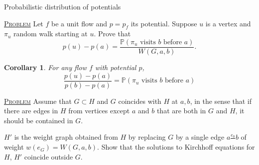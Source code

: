 \documentclass{report}
\newcommand{\matP}{\mathbb{P}}
\newcommand{\fancyem}[1]{\underline{\textsc{#1}}}
\newtheorem{corollary}{Corollary}[section]
\theoremstyle{definition}
\theoremstyle{remark}
\numberwithin{equation}{section}
\begin{document}

Probabilistic distribution of potentials

\fancyem{Problem} Let $f$ be a unit flow and $p = p_f$ its potential. Suppose $u$ is a vertex and $\pi_u$ random walk starting at $u$. Prove that \[p(u) - p(a) = \frac{\matP(\pi_u \text{ visits $b$ before $a$})}{W(G, a, b)}.\]

\begin{corollary}
    For any flow $f$ with potential $p$,
    \[
    \frac{p(u) - p(a)}{p(b) - p(a)} = \matP(\pi_u \text{ visits $b$ before $a$})
    \]
\end{corollary}

\fancyem{Problem} Assume that $G \subset H$ and $G$ coincides with $H$ at $a, b$, in the sense that if there are edges in $H$ from vertices except $a$ and $b$ that are both in $G$ and $H$, it should be contained in $G$.

$H'$ is the weight graph obtained from $H$ by replacing $G$ by a single edge $a \frac{e_0}{} b$ of weight $w(e_G) = W(G, a, b)$. Show that the solutions to Kirchhoff equations for $H$, $H'$ coincide outside $G$.
\end{document}
